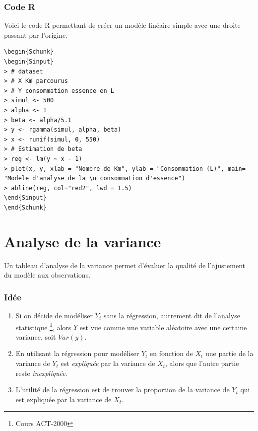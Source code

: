 \documentclass[11pt,french]{report}
\begin{document}
\subsubsection*{Code R}
Voici le code R permettant de créer un modèle linéaire simple avec une droite passant par l'origine.

\begin{lstlisting}[linerange=\\begin\{Sinput\}-\\end\{Sinput\},includerangemarker=false, caption = Code source en R pour l'exemple]
\begin{Schunk}
\begin{Sinput}
> # dataset
> # X Km parcourus
> # Y consommation essence en L
> simul <- 500
> alpha <- 1
> beta <- alpha/5.1
> y <- rgamma(simul, alpha, beta)
> x <- runif(simul, 0, 550)
> # Estimation de beta
> reg <- lm(y ~ x - 1)
> plot(x, y, xlab = "Nombre de Km", ylab = "Consommation (L)", main= "Modele d'analyse de la \n consommation d'essence")
> abline(reg, col="red2", lwd = 1.5)
\end{Sinput}
\end{Schunk}
\end{lstlisting}
\bigskip

\section{Analyse de la variance}
\label{sec:anaVar}
Un tableau d'analyse de la variance permet d'évaluer la qualité de l'ajustement du modèle aux observations.

\subsubsection*{Idée}
\begin{enumerate}
\item Si on décide de modéliser $Y_t$ sans la régression, autrement dit de l'analyse statistique \footnote{Cours ACT-2000}, alors $Y$ est vue comme une variable aléatoire avec une certaine variance, soit $Var(y)$.
\item En utilisant la régression pour modéliser $Y_t$ en fonction de $X_t$ une partie de la variance de $Y_t$ est \emph{expliquée} par la variance de $X_t$, alors que l'autre partie reste \emph{inexpliquée}.
\item L'utilité de la régression est de trouver la proportion de la variance de $Y_t$ qui est expliquée par la variance de $X_t$.
\end{enumerate}
\end{document}
